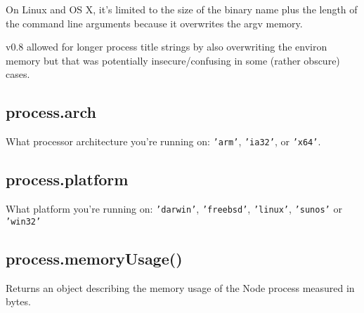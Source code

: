 On Linux and OS X, it's limited to the size of the binary name plus the
length of the command line arguments because it overwrites the argv
memory.

v0.8 allowed for longer process title strings by also overwriting the
environ memory but that was potentially insecure/confusing in some
(rather obscure) cases.

\subsection{process.arch}

What processor architecture you're running on: \texttt{'arm'},
\texttt{'ia32'}, or \texttt{'x64'}.

\begin{Shaded}
\begin{Highlighting}[]
\NormalTok{(} \NormalTok{+ }\NormalTok{);}
\end{Highlighting}
\end{Shaded}

\subsection{process.platform}

What platform you're running on: \texttt{'darwin'}, \texttt{'freebsd'},
\texttt{'linux'}, \texttt{'sunos'} or \texttt{'win32'}

\begin{Shaded}
\begin{Highlighting}[]
\NormalTok{(} \NormalTok{+ }\NormalTok{);}
\end{Highlighting}
\end{Shaded}

\subsection{process.memoryUsage()}

Returns an object describing the memory usage of the Node process
measured in bytes.

\begin{Shaded}
\begin{Highlighting}[]
 \NormalTok{);}

\NormalTok{(}\NormalTok{(}\NormalTok{()));}
\end{Highlighting}
\end{Shaded}

